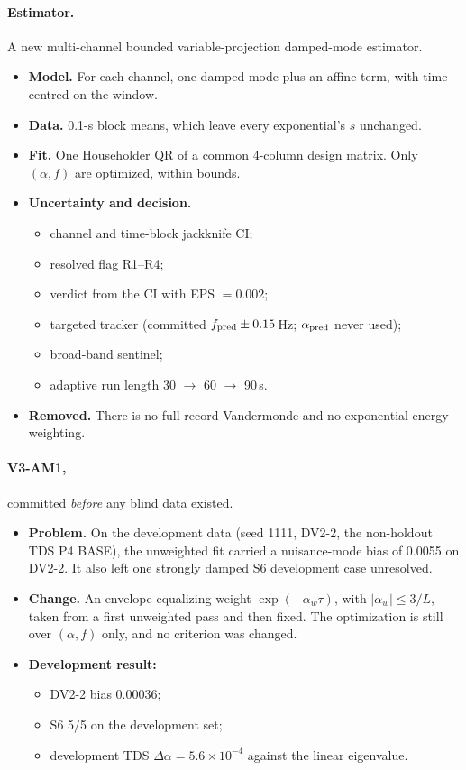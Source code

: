 \documentclass[10pt,a4paper]{article}
\begin{document}
\paragraph{Estimator.} A new multi-channel bounded variable-projection damped-mode
estimator.
\begin{itemize}
\item \textbf{Model.} For each channel, one damped mode plus an affine term,
  with time centred on the window.
\item \textbf{Data.} 0.1-s block means, which leave every exponential's $s$
  unchanged.
\item \textbf{Fit.} One Householder QR of a common 4-column design matrix. Only
  $(\alpha,f)$ are optimized, within bounds.
\item \textbf{Uncertainty and decision.}
  \begin{itemize}
  \item channel and time-block jackknife CI;
  \item resolved flag R1--R4;
  \item verdict from the CI with EPS $=0.002$;
  \item targeted tracker (committed $f_{\rm pred}\pm0.15$\,Hz; $\alpha_{\rm pred}$
    never used);
  \item broad-band sentinel;
  \item adaptive run length 30 $\to$ 60 $\to$ 90\,s.
  \end{itemize}
\item \textbf{Removed.} There is no full-record Vandermonde and no exponential
  energy weighting.
\end{itemize}

\paragraph{V3-AM1,} committed \emph{before} any blind data existed.
\begin{itemize}
\item \textbf{Problem.} On the development data (seed 1111, DV2-2, the
  non-holdout TDS P4 BASE), the unweighted fit carried a nuisance-mode bias of
  0.0055 on DV2-2. It also left one strongly damped S6 development case
  unresolved.
\item \textbf{Change.} An envelope-equalizing weight $\exp(-\alpha_w\tau)$, with
  $|\alpha_w|\le3/L$, taken from a first unweighted pass and then fixed. The
  optimization is still over $(\alpha,f)$ only, and no criterion was changed.
\item \textbf{Development result:}
  \begin{itemize}
  \item DV2-2 bias 0.00036;
  \item S6 5/5 on the development set;
  \item development TDS $\Delta\alpha=5.6\times10^{-4}$ against the linear
    eigenvalue.
  \end{itemize}
\end{itemize}
\end{document}
